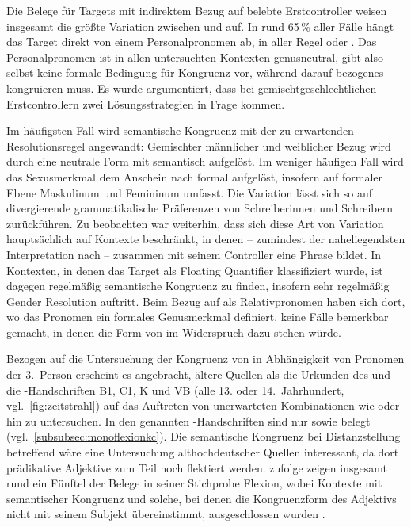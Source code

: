 Die Belege für Targets mit indirektem Bezug auf belebte Erstcontroller weisen
insgesamt die größte Variation zwischen  und  auf. In
rund 65\,\% aller Fälle hängt das Target direkt von einem Personalpronomen ab,
in aller Regel  oder . Das Personalpronomen ist in allen
untersuchten Kontexten genusneutral, gibt also selbst keine formale Bedingung
für Kongruenz vor, während darauf bezogenes  kongruieren muss.
Es wurde argumentiert, dass bei gemischtgeschlechtlichen Erstcontrollern zwei
Lösungsstrategien in Frage kommen.

Im häufigsten Fall wird semantische Kongruenz mit der zu erwartenden
Resolutionsregel angewandt: Gemischter männlicher und weiblicher Bezug wird
durch eine neutrale Form mit \mbox{} semantisch aufgelöst. Im weniger
häufigen Fall wird das Sexusmerkmal dem Anschein nach formal aufgelöst,
insofern  auf formaler Ebene Maskulinum und Femininum umfasst. Die
Variation lässt sich so auf divergierende grammatikalische Präferenzen von
Schreiberinnen und Schreibern zurück\-führen. Zu beobachten war weiterhin, dass
sich diese Art von Variation hauptsächlich auf Kontexte beschränkt, in denen
 -- zumindest der naheliegendsten Interpretation nach --
zusammen mit seinem Controller eine Phrase bildet. In Kontexten, in denen das
Target als Floating Quantifier klassifiziert wurde, ist dagegen regelmäßig
semantische Kongruenz zu finden, insofern sehr regelmäßig Gender Resolution
auftritt. Beim Bezug auf  als Relativpronomen haben sich dort, wo
das Pronomen ein formales Genusmerkmal definiert, keine Fälle bemerkbar
gemacht, in denen die Form von  im Widerspruch dazu stehen
würde.

Bezogen auf die Untersuchung der Kongruenz von  in Abhängigkeit
von Pro\-nomen der 3.~Person erscheint es angebracht, ältere Quellen als die
Urkunden des \CAO{} und die \KC{}-Handschriften
B1, C1, K und VB (alle 13. oder
14.~Jahrhundert, vgl.~\cref{fig:zeitstrahl}) auf das Auftreten von unerwarteten
Kombinationen wie  oder  hin zu untersuchen.
In den genannten \KC{}-Handschriften sind nur 
sowie  belegt (vgl.~\cref{subsubsec:monoflexionkc}). Die
semantische Kongruenz bei Distanz\-stellung betreffend wäre eine Untersuchung
althochdeutscher Quellen interessant, da dort prädikative Adjektive zum
Teil noch flektiert werden. \citet[310--311]{fleischer2007} zufolge zeigen
insgesamt rund ein Fünftel der Belege in seiner Stichprobe Flexion, wobei
Kontexte mit semantischer Kongruenz und solche, bei denen die Kongruenzform des
Adjektivs nicht mit seinem Subjekt übereinstimmt, ausgeschlossen wurden
\autocite[304]{fleischer2007}.

